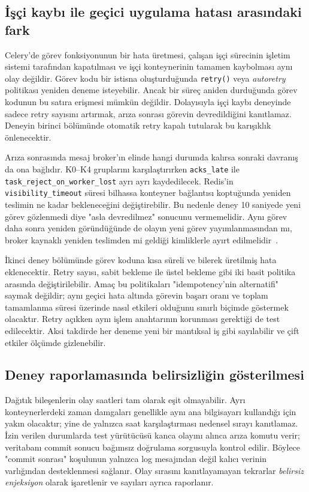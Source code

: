 \documentclass[conference,a4paper]{IEEEtran}
\newcommand{\eng}[1]{\textit{#1}}
\newcommand{\code}[1]{\texttt{#1}}
\begin{document}
\subsection{İşçi kaybı ile geçici uygulama hatası arasındaki fark}
Celery'de görev fonksiyonunun bir hata üretmesi, çalışan işçi sürecinin işletim sistemi tarafından kapatılması ve işçi konteynerinin tamamen kaybolması aynı olay değildir. Görev kodu bir istisna oluşturduğunda \code{retry()} veya \eng{autoretry} politikası yeniden deneme isteyebilir. Ancak bir süreç aniden durduğunda görev kodunun bu satıra erişmesi mümkün değildir. Dolayısıyla işçi kaybı deneyinde sadece retry sayısını artırmak, arıza sonrası görevin devredildiğini kanıtlamaz. Deneyin birinci bölümünde otomatik retry kapalı tutularak bu karışıklık önlenecektir.

Arıza sonrasında mesaj broker'ın elinde hangi durumda kalırsa sonraki davranış da ona bağlıdır. K0--K4 gruplarını karşılaştırırken \code{acks\_late} ile \code{task\_reject\_on\_worker\_lost} ayrı ayrı kaydedilecek. Redis'in \code{visibility\_timeout} süresi bilhassa konteyner bağlantısı koptuğunda yeniden teslimin ne kadar bekleneceğini değiştirebilir. Bu nedenle deney 10 saniyede yeni görev gözlenmedi diye "asla devredilmez" sonucunu vermemelidir. Aynı görev daha sonra yeniden göründüğünde de olayın yeni görev yayımlanmasından mı, broker kaynaklı yeniden teslimden mi geldiği kimliklerle ayırt edilmelidir~\cite{celerytasks,celeryredis}.

İkinci deney bölümünde görev koduna kısa süreli ve bilerek üretilmiş hata eklenecektir. Retry sayısı, sabit bekleme ile üstel bekleme gibi iki basit politika arasında değiştirilebilir. Amaç bu politikaları "idempotency'nin alternatifi" saymak değildir; aynı geçici hata altında görevin başarı oranı ve toplam tamamlanma süresi üzerinde nasıl etkileri olduğunu sınırlı biçimde göstermek olacaktır. Retry açıkken aynı işlem anahtarının korunması gerektiği de test edilecektir. Aksi takdirde her deneme yeni bir mantıksal iş gibi sayılabilir ve çift etkiler ölçümde gizlenebilir.

\subsection{Deney raporlamasında belirsizliğin gösterilmesi}
Dağıtık bileşenlerin olay saatleri tam olarak eşit olmayabilir. Ayrı konteynerlerdeki zaman damgaları genellikle aynı ana bilgisayarı kullandığı için yakın olacaktır; yine de yalnızca saat karşılaştırması nedensel sırayı kanıtlamaz. İzin verilen durumlarda test yürütücüsü kanca olayını alınca arıza komutu verir; veritabanı commit sonucu bağımsız doğrulama sorgusuyla kontrol edilir. Böylece "commit sonrası" koşulunun yalnızca log mesajından değil kalıcı verinin varlığından desteklenmesi sağlanır. Olay sırasını kanıtlayamayan tekrarlar \emph{belirsiz enjeksiyon} olarak işaretlenir ve sayıları ayrıca raporlanır.
\end{document}
